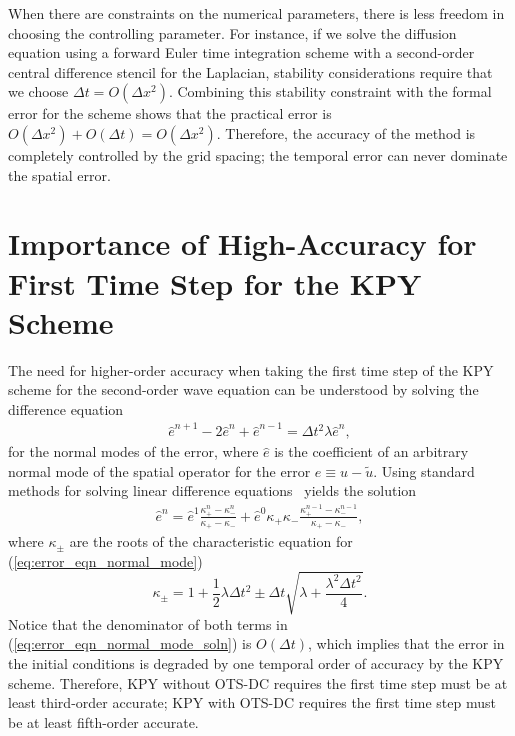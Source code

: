 \documentclass[fleqn,12pt,twoside]{article}
\newcommand{\beq}{\begin{equation}}
\newcommand{\eeq}{\end{equation}}
\newcommand{\bea}{\begin{eqnarray}}
\newcommand{\eea}{\end{eqnarray}}
\def\tu{\tilde{u}}
\def\he{\hat{e}}
\def\dt{\Delta t}
\def\dx{\Delta x}
\begin{document}
When there are constraints on the numerical parameters, there is less freedom 
in choosing the controlling parameter.  For instance, if we solve the 
diffusion equation using a forward Euler time integration scheme with a 
second-order central difference stencil for the Laplacian, stability
considerations require that we choose $\dt = O(\dx^2)$.  
Combining this stability constraint with the formal error for the scheme
shows that the practical error is 
$O(\dx^2) + O(\dt) = O(\dx^2)$.  Therefore, the accuracy of the 
method is completely controlled by the grid spacing; the temporal error can 
never dominate the spatial error.


\section{Importance of High-Accuracy for First Time Step for the KPY Scheme
         \label{appendix:KPY_analysis} }
The need for higher-order accuracy when taking the first time step of the KPY 
scheme for the second-order wave equation can be understood by solving the 
difference equation 
\bea
  \he^{n+1} - 2 \he^{n} + \he^{n-1} = \dt^2 \lambda \he^{n}
  \label{eq:error_eqn_normal_mode},
\eea
for the normal modes of the error, where $\he$ is the coefficient of an 
arbitrary normal mode of the spatial operator for the error 
$e \equiv u - \tu$.  Using standard methods for solving linear difference
equations~\cite{carrier_pearson_book} yields the solution
\bea
  \he^n = \he^1 \frac{\kappa_+^n - \kappa_-^n}{\kappa_+ - \kappa_-}
        + \he^0 \kappa_+ \kappa_-
          \frac{\kappa_+^{n-1} - \kappa_-^{n-1}}{\kappa_+ - \kappa_-},
  \label{eq:error_eqn_normal_mode_soln}
\eea
where $\kappa_\pm$ are the roots of the characteristic equation for
(\ref{eq:error_eqn_normal_mode})~\cite{kreiss2002}
\beq
  \kappa_\pm = 1 + \frac{1}{2} \lambda \dt^2
             \pm \dt \sqrt{\lambda + \frac{\lambda^2 \dt^2}{4}}.
\eeq
Notice that the denominator of both terms in
(\ref{eq:error_eqn_normal_mode_soln}) is $O(\dt)$, which implies that the
error in the initial conditions is degraded by one temporal order of accuracy
by the KPY scheme.  Therefore, KPY without OTS-DC requires the first time 
step must be at least third-order accurate; KPY with OTS-DC requires the 
first time step must be at least fifth-order accurate.


%
\end{document}
